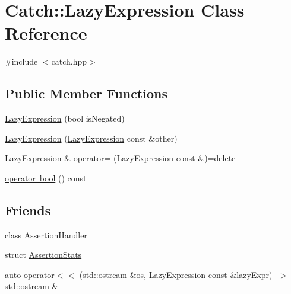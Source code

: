 \hypertarget{classCatch_1_1LazyExpression}{}\section{Catch\+:\+:Lazy\+Expression Class Reference}
\label{classCatch_1_1LazyExpression}


{\ttfamily \#include $<$catch.\+hpp$>$}

\subsection*{Public Member Functions}
\begin{DoxyCompactItemize}
\item 
\mbox{\hyperlink{classCatch_1_1LazyExpression_a47186c2487bd4bf871e870ba8048553a}{Lazy\+Expression}} (bool is\+Negated)
\item 
\mbox{\hyperlink{classCatch_1_1LazyExpression_ab82d5e94df0e159b018fbde0170e46f8}{Lazy\+Expression}} (\mbox{\hyperlink{classCatch_1_1LazyExpression}{Lazy\+Expression}} const \&other)
\item 
\mbox{\hyperlink{classCatch_1_1LazyExpression}{Lazy\+Expression}} \& \mbox{\hyperlink{classCatch_1_1LazyExpression_ae4ae00d4f36f084c369f2da36565a822}{operator=}} (\mbox{\hyperlink{classCatch_1_1LazyExpression}{Lazy\+Expression}} const \&)=delete
\item 
\mbox{\hyperlink{classCatch_1_1LazyExpression_acdb846cb230cecfc6aca7a925b31fbca}{operator bool}} () const
\end{DoxyCompactItemize}
\subsection*{Friends}
\begin{DoxyCompactItemize}
\item 
class \mbox{\hyperlink{classCatch_1_1LazyExpression_a4301a3aa57b612dd8b6ef8461742ecab}{Assertion\+Handler}}
\item 
struct \mbox{\hyperlink{classCatch_1_1LazyExpression_a64019eb137f5ce447cdc71cb80b6e7a4}{Assertion\+Stats}}
\item 
auto \mbox{\hyperlink{classCatch_1_1LazyExpression_aa01086581cab2fcd2d4580b8fa787dfc}{operator$<$$<$}} (std\+::ostream \&os, \mbox{\hyperlink{classCatch_1_1LazyExpression}{Lazy\+Expression}} const \&lazy\+Expr) -\/$>$ std\+::ostream \&
\end{DoxyCompactItemize}


